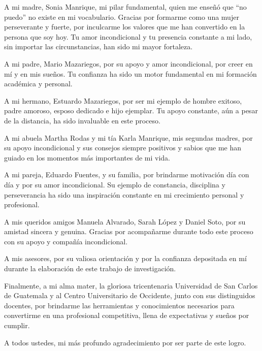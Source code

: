 \documentclass[11pt,letterpaper]{report}
\begin{document}
A mi madre, Sonia Manrique, mi pilar fundamental, quien me enseñó que ``no
puedo'' no existe en mi vocabulario. Gracias por formarme como una mujer
perseverante y fuerte, por inculcarme los valores que me han convertido en la 
persona que soy hoy. Tu amor incondicional y tu presencia constante a mi lado, 
sin importar las circunstancias, han sido mi mayor fortaleza.

A mi padre, Mario Mazariegos, por su apoyo y amor incondicional, por creer en 
mí y en mis sueños. Tu confianza ha sido un motor fundamental en mi formación 
académica y personal.

A mi hermano, Estuardo Mazariegos, por ser mi ejemplo de hombre exitoso, padre 
amoroso, esposo dedicado e hijo ejemplar. Tu apoyo constante, aún a pesar de 
la distancia, ha sido invaluable en este proceso.

A mi abuela Martha Rodas y mi tía Karla Manrique, mis segundas madres, por su 
apoyo incondicional y sus consejos siempre positivos y sabios que me han 
guiado en los momentos más importantes de mi vida.

A mi pareja, Eduardo Fuentes, y su familia, por brindarme motivación día con 
día y por su amor incondicional. Su ejemplo de constancia, disciplina y 
perseverancia ha sido una inspiración constante en mi crecimiento personal y 
profesional.

A mis queridos amigos Manuela Alvarado, Sarah López y Daniel Soto, por su 
amistad sincera y genuina. Gracias por acompañarme durante todo este proceso 
con su apoyo y compañía incondicional.

A mis asesores, por su valiosa orientación y por la confianza depositada en mí 
durante la elaboración de este trabajo de investigación.

Finalmente, a mi alma mater, la gloriosa tricentenaria Universidad de San 
Carlos de Guatemala y al Centro Universitario de Occidente, junto con sus 
distinguidos docentes, por brindarme las herramientas y conocimientos 
necesarios para convertirme en una profesional competitiva, llena de 
expectativas y sueños por cumplir.

A todos ustedes, mi más profundo agradecimiento por ser parte de este logro.


\end{document}
